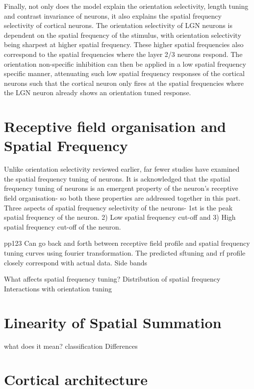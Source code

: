 Finally, not only does the model explain the orientation selectivity, length tuning and contrast invariance of neurons, it also explains the spatial frequency selectivity of cortical neurons. The orientation selectivity of LGN neurons is dependent on the spatial frequency of the stimulus, with orientation selectivity being sharpest at higher spatial frequency. These higher spatial frequencies also correspond to the spatial frequencies where the layer 2/3 neurons respond. The orientation non-specific inhibition can then be applied in a low spatial frequency specific manner, attenuating such low spatial frequency responses of the cortical neurons such that the cortical neuron only fires at the spatial frequencies where the LGN neuron already shows an orientation tuned response.


\section{Receptive field organisation and Spatial Frequency}


Unlike orientation selectivity reviewed earlier, far fewer studies have examined the spatial frequency tuning of neurons. It is acknowledged that the spatial frequency tuning of neurons is an emergent property of the neuron's receptive field organisation- so both these properties are addressed together in this part.
Three aspects of spatial frequency selectivity of the neurons- 1st is the peak spatial frequency of the neuron. 2) Low spatial frequency cut-off and 3) High spatial frequency cut-off of the neuron.

\cite{DeValois1990a} pp123 Can go back and forth between receptive field profile and spatial frequency tuning curves using fourier transformation. The predicted sftuning and rf profile closely correspond with actual data. Side bands 


What affects spatial frequency tuning?
Distribution of spatial frequency
Interactions with orientation tuning


\section{Linearity of Spatial Summation}

what does it mean?
classification
Differences

\section{Cortical architecture}

